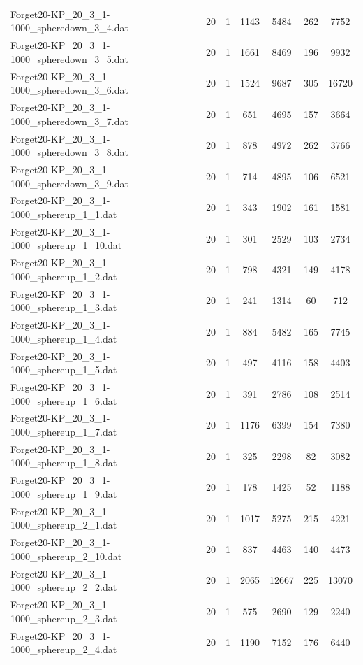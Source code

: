 \begin{table}[!ht]
\begin{tabular}{lcccccc}
Forget20-KP\_20\_3\_1-1000\_spheredown\_3\_4.dat & 20 & 1 & 1143 & 5484 & 262 & 7752 \\
Forget20-KP\_20\_3\_1-1000\_spheredown\_3\_5.dat & 20 & 1 & 1661 & 8469 & 196 & 9932 \\
Forget20-KP\_20\_3\_1-1000\_spheredown\_3\_6.dat & 20 & 1 & 1524 & 9687 & 305 & 16720 \\
Forget20-KP\_20\_3\_1-1000\_spheredown\_3\_7.dat & 20 & 1 & 651 & 4695 & 157 & 3664 \\
Forget20-KP\_20\_3\_1-1000\_spheredown\_3\_8.dat & 20 & 1 & 878 & 4972 & 262 & 3766 \\
Forget20-KP\_20\_3\_1-1000\_spheredown\_3\_9.dat & 20 & 1 & 714 & 4895 & 106 & 6521 \\
Forget20-KP\_20\_3\_1-1000\_sphereup\_1\_1.dat & 20 & 1 & 343 & 1902 & 161 & 1581 \\
Forget20-KP\_20\_3\_1-1000\_sphereup\_1\_10.dat & 20 & 1 & 301 & 2529 & 103 & 2734 \\
Forget20-KP\_20\_3\_1-1000\_sphereup\_1\_2.dat & 20 & 1 & 798 & 4321 & 149 & 4178 \\
Forget20-KP\_20\_3\_1-1000\_sphereup\_1\_3.dat & 20 & 1 & 241 & 1314 & 60 & 712 \\
Forget20-KP\_20\_3\_1-1000\_sphereup\_1\_4.dat & 20 & 1 & 884 & 5482 & 165 & 7745 \\
Forget20-KP\_20\_3\_1-1000\_sphereup\_1\_5.dat & 20 & 1 & 497 & 4116 & 158 & 4403 \\
Forget20-KP\_20\_3\_1-1000\_sphereup\_1\_6.dat & 20 & 1 & 391 & 2786 & 108 & 2514 \\
Forget20-KP\_20\_3\_1-1000\_sphereup\_1\_7.dat & 20 & 1 & 1176 & 6399 & 154 & 7380 \\
Forget20-KP\_20\_3\_1-1000\_sphereup\_1\_8.dat & 20 & 1 & 325 & 2298 & 82 & 3082 \\
Forget20-KP\_20\_3\_1-1000\_sphereup\_1\_9.dat & 20 & 1 & 178 & 1425 & 52 & 1188 \\
Forget20-KP\_20\_3\_1-1000\_sphereup\_2\_1.dat & 20 & 1 & 1017 & 5275 & 215 & 4221 \\
Forget20-KP\_20\_3\_1-1000\_sphereup\_2\_10.dat & 20 & 1 & 837 & 4463 & 140 & 4473 \\
Forget20-KP\_20\_3\_1-1000\_sphereup\_2\_2.dat & 20 & 1 & 2065 & 12667 & 225 & 13070 \\
Forget20-KP\_20\_3\_1-1000\_sphereup\_2\_3.dat & 20 & 1 & 575 & 2690 & 129 & 2240 \\
Forget20-KP\_20\_3\_1-1000\_sphereup\_2\_4.dat & 20 & 1 & 1190 & 7152 & 176 & 6440 \\

\end{tabular}
\end{table}
